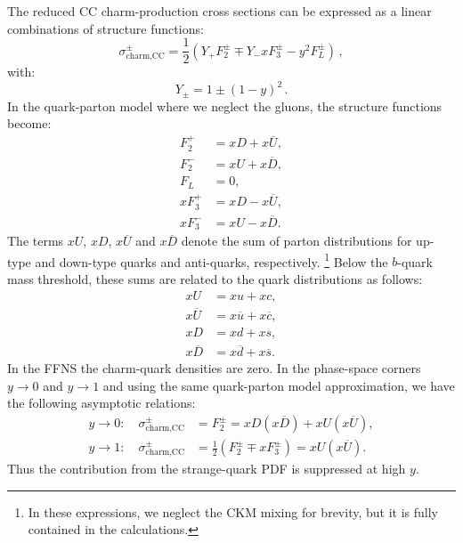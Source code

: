 \documentclass[pdftex,twocolumn,epjc3]{svjour3}          %
\begin{document}
The reduced CC charm-production cross sections can be expressed as a
linear combinations of structure functions:
\begin{equation}
  \sigma^{\pm}_{\text{charm,CC}} = \frac12\left(Y_{+}F_2^{\pm} \mp
    Y_{-}xF_3^{\pm} - y^2F_L^{\pm}\right)\,,
\end{equation}
with:
\begin{equation}
  Y_{\pm} = 1 \pm (1-y)^2 \,.
\end{equation}
In the quark-parton model
where we neglect the gluons, the structure
functions become:
\begin{equation}
\begin{split}
    F_2^{+} &= xD + x\overline{U}, \\
    F_2^{-} &= xU + x\overline{D},\\
    F_L &= 0,\\
    xF_3^{+} &= xD - x\overline{U}, \\
    xF_3^{-} &= xU - x\overline{D}.
\end{split}
\end{equation}
The terms $xU$, $xD$, $x\overline{U}$ and $x\overline{D}$ denote the
sum of parton distributions for up-type and down-type quarks and
anti-quarks, respectively.%
\footnote{In these expressions, we neglect the CKM mixing for brevity, but it is fully contained in the calculations.} 
Below the $b$-quark mass threshold, these
sums are related to the quark distributions as follows:
\begin{equation}
\begin{split}
 xU &= xu + xc , \\
 x\overline{U} &= x\overline{u} + x\overline{c} , \\
 xD &= xd + xs , \\
 x\overline{D} &= x\overline{d} + x\overline{s}.
\end{split}
\end{equation}
In the FFNS the charm-quark densities are zero. In the phase-space
corners $y \to 0$ and $y \to 1$ and using the same quark-parton model approximation, we have the following asymptotic
relations:
\begin{equation}
\begin{split}
 y \to 0: \quad \sigma^{\pm}_{\text{charm,CC}} &= F_2^{\pm} = xD(x\overline{D}) + xU(x\overline{U}), \\[10pt]
 y \to 1: \quad \sigma^{\pm}_{\text{charm,CC}} &= \frac12(F_2^{\pm} \mp xF_3^{\pm}) = xU (x\overline{U}).
\label{eq:y01}
\end{split}
\end{equation}
Thus the contribution from the strange-quark PDF is suppressed at high
$y$.
\end{document}
